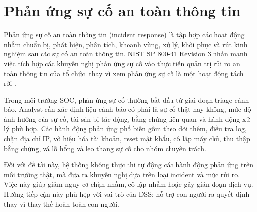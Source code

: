 \documentclass[a4paper,12pt,oneside]{book}
\begin{document}
\section{Phản ứng sự cố an toàn thông tin}
{\fontsize{13pt}{15.6pt}\selectfont

Phản ứng sự cố an toàn thông tin (incident response) là tập hợp các hoạt động nhằm chuẩn bị, phát hiện, phân tích, khoanh vùng, xử lý, khôi phục và rút kinh nghiệm sau các sự cố an toàn thông tin. NIST SP 800-61 Revision 3 nhấn mạnh việc tích hợp các khuyến nghị phản ứng sự cố vào thực tiễn quản trị rủi ro an toàn thông tin của tổ chức, thay vì xem phản ứng sự cố là một hoạt động tách rời \cite{nist80061r3}.

\noindent Trong môi trường SOC, phản ứng sự cố thường bắt đầu từ giai đoạn triage cảnh báo. Analyst cần xác định liệu cảnh báo có phải là sự cố thật hay không, mức độ ảnh hưởng của sự cố, tài sản bị tác động, bằng chứng liên quan và hành động xử lý phù hợp. Các hành động phản ứng phổ biến gồm theo dõi thêm, điều tra log, chặn địa chỉ IP, vô hiệu hóa tài khoản, reset mật khẩu, cô lập máy chủ, thu thập bằng chứng, vá lỗ hổng và leo thang sự cố cho nhóm chuyên trách.

\noindent Đối với đề tài này, hệ thống không thực thi tự động các hành động phản ứng trên môi trường thật, mà đưa ra khuyến nghị dựa trên loại incident và mức rủi ro. Việc này giúp giảm nguy cơ chặn nhầm, cô lập nhầm hoặc gây gián đoạn dịch vụ. Hướng tiếp cận này phù hợp với vai trò của DSS: hỗ trợ con người ra quyết định thay vì thay thế hoàn toàn con người.

}
\end{document}
